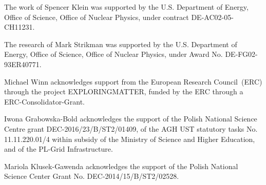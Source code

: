 The work of Spencer Klein was supported by the U.S. Department of Energy, Office of Science, Office of Nuclear Physics, under contract DE-AC02-05-CH11231.

The research of Mark Strikman was supported by the U.S. Department of Energy, Office of Science, Office of Nuclear Physics, under Award No. DE-FG02-93ER40771.

Michael Winn acknowledges support from the European Research Council~(ERC) through the project EXPLORINGMATTER, funded by the ERC through a ERC-Consolidator-Grant.

Iwona Grabowska-Bold acknowledges the support of the Polish National Science Centre grant DEC-2016/23/B/ST2/01409, of the AGH UST statutory tasks No. 11.11.220.01/4 within subsidy of the Ministry of Science and Higher Education, and of the PL-Grid Infrastructure.

Mariola Klusek-Gawenda acknowledges the support of the Polish National Science Center Grant No. DEC-2014/15/B/ST2/02528.
